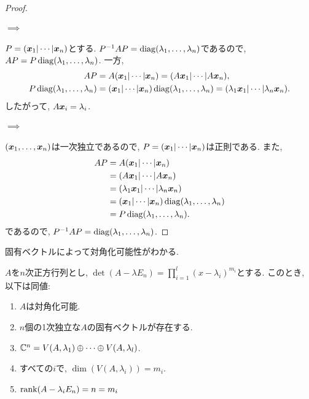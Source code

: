 \begin{proof}
  \paragraph{$\implies$}
  $P=(\boldsymbol{x}_1|\cdots|\boldsymbol{x}_n)$とする.
  $P^{-1}AP=\operatorname{diag}(\lambda_1,\ldots,\lambda_n)$であるので,
  $AP=P\operatorname{diag}(\lambda_1,\ldots,\lambda_n)$.
  一方,
  \begin{align*}
    AP&=A(\boldsymbol{x}_1|\cdots|\boldsymbol{x}_n)=(A\boldsymbol{x}_1|\cdots|A\boldsymbol{x}_n),\\
    P\operatorname{diag}(\lambda_1,\ldots,\lambda_n)&=(\boldsymbol{x}_1|\cdots|\boldsymbol{x}_n)\operatorname{diag}(\lambda_1,\ldots,\lambda_n)=
    (\lambda_1\boldsymbol{x}_1|\cdots|\lambda_n\boldsymbol{x}_n).
  \end{align*}
  したがって, $A\boldsymbol{x}_i=\lambda_i$.

  \paragraph{$\implies$}
  $(\boldsymbol{x}_1,\ldots,\boldsymbol{x}_n)$は一次独立であるので,
  $P=(\boldsymbol{x}_1|\cdots|\boldsymbol{x}_n)$は正則である.
  また,
  \begin{align*}
    AP&=A(\boldsymbol{x}_1|\cdots|\boldsymbol{x}_n)\\
    &=(A\boldsymbol{x}_1|\cdots|A\boldsymbol{x}_n)\\
    &=(\lambda_1\boldsymbol{x}_1|\cdots|\lambda_n\boldsymbol{x}_n)\\
    &=(\boldsymbol{x}_1|\cdots|\boldsymbol{x}_n)\operatorname{diag}(\lambda_1,\ldots,\lambda_n)\\
    &=P\operatorname{diag}(\lambda_1,\ldots,\lambda_n).
  \end{align*}
  であるので,
  $P^{-1}AP=\operatorname{diag}(\lambda_1,\ldots,\lambda_n)$.
\end{proof}
\begin{remark}
固有ベクトルによって対角化可能性がわかる.
\end{remark}

\begin{prop}
  $A$を$n$次正方行列とし,
  $\det(A-\lambda E_n)=\prod_{i=1}^l(x-\lambda_i)^{m_i}$とする.
  このとき, 以下は同値:
  \begin{enumerate}
  \item
    $A$は対角化可能.
  \item
    $n$個の1次独立な$A$の固有ベクトルが存在する.
  \item
    $\mathbb{C}^n=V(A,\lambda_1)\oplus\cdots\oplus V(A,\lambda_l)$.
  \item
    すべての$i$で, $\dim(V(A,\lambda_i))=m_i$.
  \item
    $\operatorname{rank}(A-\lambda_i E_n)=n=m_i$
  \end{enumerate}
\end{prop}


